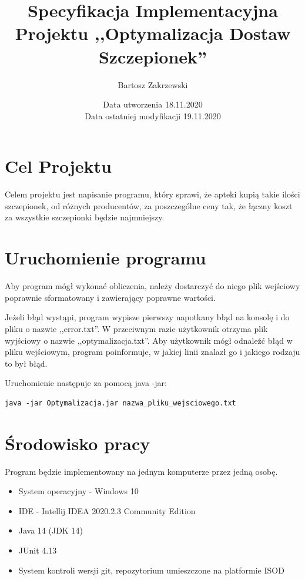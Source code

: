 \documentclass{article}
\title {Specyfikacja Implementacyjna Projektu ,,Optymalizacja Dostaw Szczepionek''}
\author{Bartosz Zakrzewski}
\date{Data utworzenia 18.11.2020 \\ Data ostatniej modyfikacji 19.11.2020}
\begin{document}
\maketitle
\thispagestyle{empty}

\clearpage
\tableofcontents
\thispagestyle{empty}

\clearpage

\section{Cel Projektu}
Celem projektu jest napisanie programu, który sprawi, że apteki kupią takie ilości szczepionek, od różnych producentów, za poszczególne ceny tak, że łączny koszt za wszystkie szczepionki będzie najmniejszy.

\section{Uruchomienie programu}

Aby program mógł wykonać obliczenia, należy dostarczyć do niego plik wejściowy poprawnie sformatowany i zawierający poprawne wartości.
\\

\par Jeżeli błąd wystąpi, program wypisze pierwszy napotkany błąd na konsolę i do pliku o nazwie ,,error.txt''. W przeciwnym razie użytkownik otrzyma plik wyjściowy o nazwie ,,optymalizacja.txt''.
Aby użytkownik mógł odnaleźć błąd w pliku wejściowym, program poinformuje, w jakiej linii znalazł go i jakiego rodzaju to był błąd.
\\ 
\par Uruchomienie następuje za pomocą java -jar:

\begin{lstlisting}
java -jar Optymalizacja.jar nazwa_pliku_wejsciowego.txt
\end{lstlisting}

\section{Środowisko pracy}
Program będzie implementowany na jednym komputerze przez jedną osobę.

\begin{itemize}
    \item System operacyjny - Windows 10
    \item IDE - Intellij IDEA 2020.2.3 Community Edition
    \item Java 14 (JDK 14)
    \item JUnit 4.13
    \item System kontroli wersji git, repozytorium umieszczone na platformie ISOD
\end{itemize}
\end{document}
